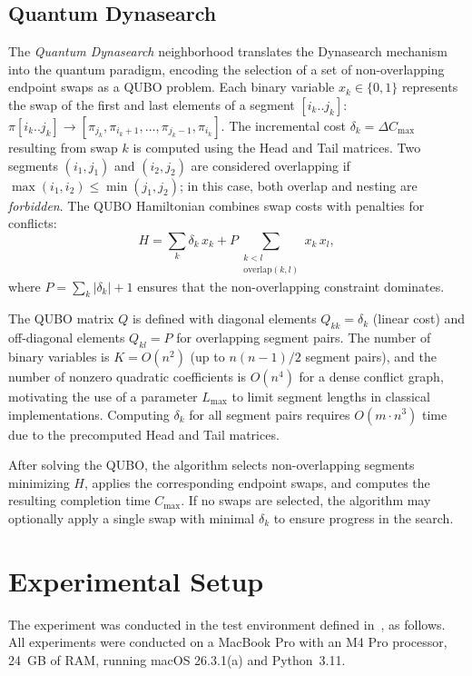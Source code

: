 \documentclass[10pt,twoside,twocolumn,a4paper]{article}
\begin{document}
\subsection{Quantum Dynasearch}
The \emph{Quantum Dynasearch} neighborhood translates the Dynasearch mechanism into the quantum paradigm, encoding the selection of a set of non-overlapping endpoint swaps as a QUBO problem. Each binary variable $x_k \in \{0,1\}$ represents the swap of the first and last elements of a segment $[i_k..j_k]$:
$\pi[i_k..j_k] \to [\pi_{j_k}, \pi_{i_k+1}, \ldots, \pi_{j_k-1}, \pi_{i_k}]$.
The incremental cost $\delta_k = \Delta C_{\max}$ resulting from swap $k$ is computed using the Head and Tail matrices. Two segments $(i_1,j_1)$ and $(i_2,j_2)$ are considered overlapping if $\max(i_1,i_2) \le \min(j_1,j_2)$; in this case, both overlap and nesting are \emph{forbidden}. The QUBO Hamiltonian combines swap costs with penalties for conflicts:
\begin{equation}
    H = \sum_{k} \delta_k\, x_k
        + P \!\sum_{\substack{k < l \\ \mathrm{overlap}(k,l)}} x_k\, x_l,
    \label{eq:qubo_dyna}
\end{equation}
where $P = \sum_k |\delta_k| + 1$ ensures that the non-overlapping constraint dominates.

The QUBO matrix $Q$ is defined with diagonal elements $Q_{kk} = \delta_k$ (linear cost) and off-diagonal elements $Q_{kl} = P$ for overlapping segment pairs. The number of binary variables is $K = O(n^2)$ (up to $n(n-1)/2$ segment pairs), and the number of nonzero quadratic coefficients is $O(n^4)$ for a dense conflict graph, motivating the use of a parameter $L_{\max}$ to limit segment lengths in classical implementations. Computing $\delta_k$ for all segment pairs requires $O(m \cdot n^3)$ time due to the precomputed Head and Tail matrices.

After solving the QUBO, the algorithm selects non-overlapping segments minimizing $H$, applies the corresponding endpoint swaps, and computes the resulting completion time $C_{\max}$. If no swaps are selected, the algorithm may optionally apply a single swap with minimal $\delta_k$ to ensure progress in the search.


\section{Experimental Setup}
The experiment was conducted in the test environment defined in~\cite{WojewodzkiBozejko2026}, as follows. All experiments were conducted on a MacBook Pro with an M4 Pro processor, 24~GB of RAM, running macOS 26.3.1(a) and Python~3.11.
\end{document}
